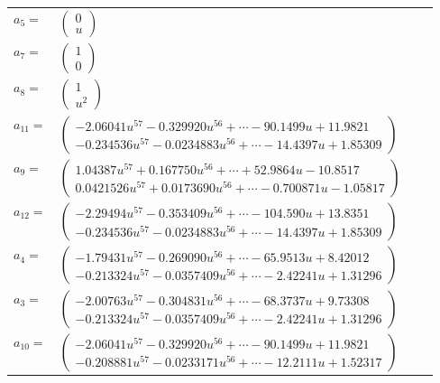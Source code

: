 \documentclass[1p]{elsarticle_modified}
\theoremstyle{definition}
\begin{document}
\begin{tabular}{m{7pt} m{180pt} m{7pt} m{180pt} }
\flushright $a_{5}=$&$\begin{pmatrix}0\\u\end{pmatrix}$ \\
\flushright $a_{7}=$&$\begin{pmatrix}1\\0\end{pmatrix}$ \\
\flushright $a_{8}=$&$\begin{pmatrix}1\\u^2\end{pmatrix}$ \\
\flushright $a_{11}=$&$\begin{pmatrix}-2.06041 u^{57}-0.329920 u^{56}+\cdots-90.1499 u+11.9821\\-0.234536 u^{57}-0.0234883 u^{56}+\cdots-14.4397 u+1.85309\end{pmatrix}$ \\
\flushright $a_{9}=$&$\begin{pmatrix}1.04387 u^{57}+0.167750 u^{56}+\cdots+52.9864 u-10.8517\\0.0421526 u^{57}+0.0173690 u^{56}+\cdots-0.700871 u-1.05817\end{pmatrix}$ \\
\flushright $a_{12}=$&$\begin{pmatrix}-2.29494 u^{57}-0.353409 u^{56}+\cdots-104.590 u+13.8351\\-0.234536 u^{57}-0.0234883 u^{56}+\cdots-14.4397 u+1.85309\end{pmatrix}$ \\
\flushright $a_{4}=$&$\begin{pmatrix}-1.79431 u^{57}-0.269090 u^{56}+\cdots-65.9513 u+8.42012\\-0.213324 u^{57}-0.0357409 u^{56}+\cdots-2.42241 u+1.31296\end{pmatrix}$ \\
\flushright $a_{3}=$&$\begin{pmatrix}-2.00763 u^{57}-0.304831 u^{56}+\cdots-68.3737 u+9.73308\\-0.213324 u^{57}-0.0357409 u^{56}+\cdots-2.42241 u+1.31296\end{pmatrix}$ \\
\flushright $a_{10}=$&$\begin{pmatrix}-2.06041 u^{57}-0.329920 u^{56}+\cdots-90.1499 u+11.9821\\-0.208881 u^{57}-0.0233171 u^{56}+\cdots-12.2111 u+1.52317\end{pmatrix}$ \\

\end{tabular}
\end{document}
